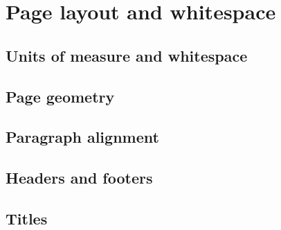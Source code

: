 \chapter{Page layout and whitespace}

\section{Units of measure and whitespace}
\section{Page geometry}



\section{Paragraph alignment}

\section{Headers and footers}

\section{Titles}
